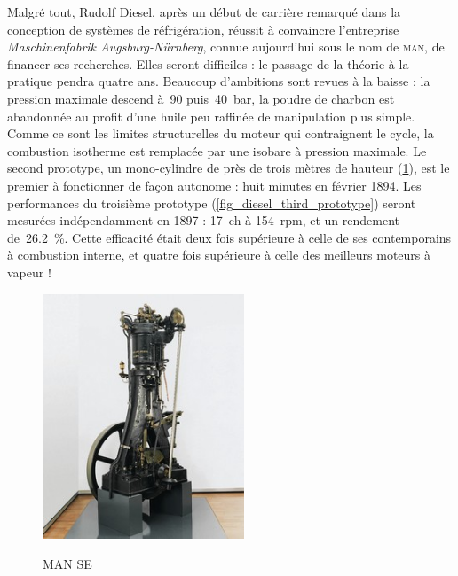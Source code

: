 	Malgré tout, Rudolf Diesel, après un début de carrière remarqué dans la conception de systèmes de réfrigération, réussit à convaincre l’entreprise \textit{Maschinenfabrik Augsburg-Nürnberg}, connue aujourd’hui sous le nom de \textsc{man}, de financer ses recherches. Elles seront difficiles : le passage de la théorie à la pratique pendra quatre ans. Beaucoup d’ambitions sont revues à la baisse : la pression maximale descend à~\num{90} puis~\SI{40}{\bar}, la poudre de charbon est abandonnée au profit d’une huile peu raffinée de manipulation plus simple. Comme ce sont les limites structurelles du moteur qui contraignent le cycle, la combustion isotherme est remplacée par une isobare à pression maximale. Le second prototype, un mono-cylindre de près de trois mètres de hauteur (\cref{fig_diesel_second_prototype}), est le premier à fonctionner de façon autonome : huit minutes en février 1894. Les performances du troisième prototype (\cref{fig_diesel_third_prototype})	seront mesurées indépendamment en 1897 : \SI{17}{ch} à \SI{154}{rpm}, et un rendement de~\SI{26,2}{\percent}. Cette efficacité était deux fois supérieure à celle de ses contemporains à combustion interne, et quatre fois supérieure à celle des meilleurs moteurs à vapeur !
	\begin{figure}
		\begin{center}
			\includegraphics[width=6cm]{images/diesel_second_prototype.jpg}
		\end{center}
		{ \ccbysa MAN SE}
		\label{fig_diesel_second_prototype}
	\end{figure}
